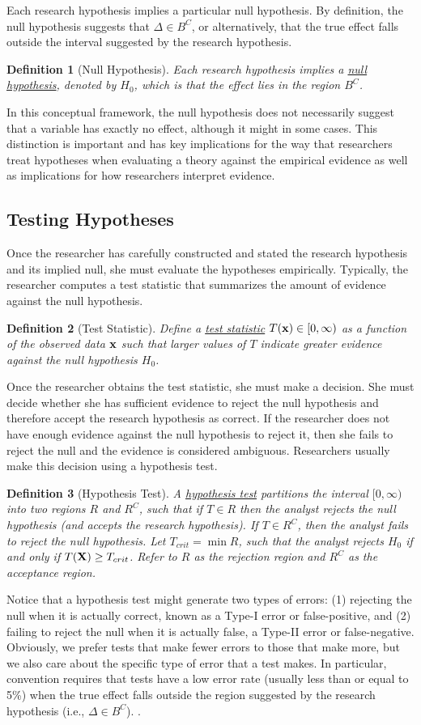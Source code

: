 \documentclass[12pt]{article}
\newtheorem{mydef}{Definition}
\begin{document}
Each research hypothesis implies a particular null hypothesis. By definition, the null hypothesis suggests that $\Delta \in B^C$, or alternatively, that the true effect falls outside the interval suggested by the research hypothesis. 
\begin{mydef}[Null Hypothesis]
Each research hypothesis implies a \underline{null hypothesis}, denoted by $H_0$, which is that the effect lies in the region $B^C$.
\end{mydef}
\noindent In this conceptual framework, the null hypothesis does not necessarily suggest that a variable has exactly no effect, although it might in some cases. This distinction is important and has key implications for the way that researchers treat hypotheses when evaluating a theory against the empirical evidence as well as implications for how researchers interpret evidence.
\subsection*{Testing Hypotheses}
Once the researcher has carefully constructed and stated the research hypothesis and its implied null, she must evaluate the hypotheses empirically. Typically, the researcher computes a test statistic that summarizes the amount of evidence against the null hypothesis.
\begin{mydef}[Test Statistic]
Define a \underline{test statistic} $T({\bf{x}}) \in [0, \infty)$ as a function of the observed data $\bf{x}$ such that larger values of $T$ indicate greater evidence against the null hypothesis $H_0$.
\end{mydef}
Once the researcher obtains the test statistic, she must make a decision. She must decide whether she has sufficient evidence to reject the null hypothesis and therefore accept the research hypothesis as correct. If the researcher does not have enough evidence against the null hypothesis to reject it, then she fails to reject the null and the evidence is considered ambiguous. Researchers usually make this decision using a hypothesis test.
\begin{mydef}[Hypothesis Test]
A \underline{hypothesis test} partitions the interval $[0,\infty)$ into two regions $R$ and $R^C$, such that if $T \in R$ then the analyst rejects the null hypothesis (and accepts the research hypothesis). If $T \in R^C$, then the analyst fails to reject the null hypothesis. Let $T_{crit} = \min R$, such that the analyst rejects $H_0$ if and only if $T({\bf{X}}) \geq T_{crit}$. Refer to $R$ as the rejection region and $R^C$ as the acceptance region.
\end{mydef}
Notice that a hypothesis test might generate two types of errors: (1) rejecting the null when it is actually correct, known as a Type-I error or false-positive, and (2) failing to reject the null when it is actually false, a Type-II error or false-negative. Obviously, we prefer tests that make fewer errors to those that make more, but we also care about the specific type of error that a test makes. In particular, convention requires that tests have a low error rate (usually less than or equal to 5\%) when the true effect falls outside the region suggested by the research hypothesis (i.e., $\Delta \in B^C$). .
\end{document}
